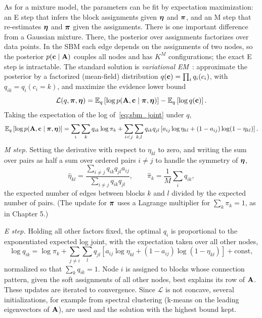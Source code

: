 As for a mixture model, the parameters can be fit by expectation maximization: an E step that infers the block assignments given $\boldsymbol{\eta}$ and $\boldsymbol{\pi}$, and an M step that re-estimates $\boldsymbol{\eta}$ and $\boldsymbol{\pi}$ given the assignments. There is one important difference from a Gaussian mixture. There, the posterior over assignments factorizes over data points. In the SBM each edge depends on the assignments of two nodes, so the posterior $p(\mathbf{c}\mid\mathbf{A})$ couples all nodes and has $K^M$ configurations; the exact E step is intractable. The standard solution is \emph{variational EM}~\citep{daudin2008}: approximate the posterior by a factorized (mean-field) distribution $q(\mathbf{c})=\prod_iq_i(c_i)$, with $q_{ik}=q_i(c_i=k)$, and maximize the evidence lower bound
\begin{equation}
  \mathcal{L}(q,\boldsymbol{\pi},\boldsymbol{\eta}) = \mathbb{E}_q\left[\log p(\mathbf{A},\mathbf{c}\mid\boldsymbol{\pi},\boldsymbol{\eta})\right] - \mathbb{E}_q\left[\log q(\mathbf{c})\right].
\end{equation}
Taking the expectation of the log of~\eqref{eq:sbm_joint} under $q$,
\begin{equation}
  \mathbb{E}_q\left[\log p(\mathbf{A},\mathbf{c}\mid\boldsymbol{\pi},\boldsymbol{\eta})\right] = \sum_{i}\sum_kq_{ik}\log\pi_k + \sum_{i<j}\sum_{k,l}q_{ik}q_{jl}\left[a_{ij}\log\eta_{kl}+(1-a_{ij})\log(1-\eta_{kl})\right].
\end{equation}
\emph{M step.} Setting the derivative with respect to $\eta_{kl}$ to zero, and writing the sum over pairs as half a sum over ordered pairs $i\neq j$ to handle the symmetry of $\boldsymbol{\eta}$,
\begin{equation}
  \hat\eta_{kl} = \frac{\sum_{i\neq j}q_{ik}q_{jl}a_{ij}}{\sum_{i\neq j}q_{ik}q_{jl}},
  \qquad \hat\pi_k = \frac1M\sum_iq_{ik},
\end{equation}
the expected number of edges between blocks $k$ and $l$ divided by the expected number of pairs. (The update for $\boldsymbol{\pi}$ uses a Lagrange multiplier for $\sum_k\pi_k=1$, as in Chapter 5.)

\emph{E step.} Holding all other factors fixed, the optimal $q_i$ is proportional to the exponentiated expected log joint, with the expectation taken over all other nodes,
\begin{equation}
  \log q_{ik} = \log\pi_k + \sum_{j\neq i}\sum_lq_{jl}\left[a_{ij}\log\eta_{kl}+(1-a_{ij})\log(1-\eta_{kl})\right] + \text{const},
\end{equation}
normalized so that $\sum_kq_{ik}=1$. Node $i$ is assigned to blocks whose connection pattern, given the soft assignments of all other nodes, best explains its row of $\mathbf{A}$. These updates are iterated to convergence. Since $\mathcal{L}$ is not concave, several initializations, for example from spectral clustering (k-means on the leading eigenvectors of $\mathbf{A}$), are used and the solution with the highest bound kept.


